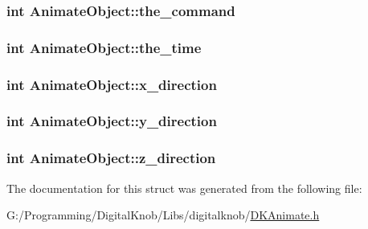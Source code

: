 \hypertarget{struct_animate_object_a4a2eff654ba594cdb3793873367ab25a}{
\subsubsection[{the\-\_\-command}]{\setlength{\rightskip}{0pt plus 5cm}int Animate\-Object\-::the\-\_\-command}}\label{struct_animate_object_a4a2eff654ba594cdb3793873367ab25a}
\hypertarget{struct_animate_object_a0ac2c2373afec4a28041721f159b4456}{
\subsubsection[{the\-\_\-time}]{\setlength{\rightskip}{0pt plus 5cm}int Animate\-Object\-::the\-\_\-time}}\label{struct_animate_object_a0ac2c2373afec4a28041721f159b4456}
\hypertarget{struct_animate_object_ae6a14cccf996f8d835a365722cc427ab}{
\subsubsection[{x\-\_\-direction}]{\setlength{\rightskip}{0pt plus 5cm}int Animate\-Object\-::x\-\_\-direction}}\label{struct_animate_object_ae6a14cccf996f8d835a365722cc427ab}
\hypertarget{struct_animate_object_a214d10261c1c05ceeabaeba9215bfbdd}{
\subsubsection[{y\-\_\-direction}]{\setlength{\rightskip}{0pt plus 5cm}int Animate\-Object\-::y\-\_\-direction}}\label{struct_animate_object_a214d10261c1c05ceeabaeba9215bfbdd}
\hypertarget{struct_animate_object_ad17313497e1b7d2fd496eff00b260f74}{
\subsubsection[{z\-\_\-direction}]{\setlength{\rightskip}{0pt plus 5cm}int Animate\-Object\-::z\-\_\-direction}}\label{struct_animate_object_ad17313497e1b7d2fd496eff00b260f74}


The documentation for this struct was generated from the following file\-:\begin{DoxyCompactItemize}
\item 
G\-:/\-Programming/\-Digital\-Knob/\-Libs/digitalknob/\hyperlink{_d_k_animate_8h}{D\-K\-Animate.\-h}\end{DoxyCompactItemize}
